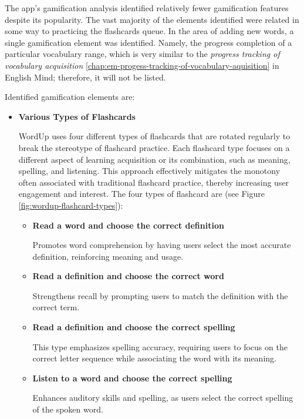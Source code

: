 The app's gamification analysis identified relatively fewer gamification features despite its popularity. The vast majority of the elements identified were related in some way to practicing the flashcards queue. In the area of adding new words, a single gamification element was identified. Namely, the progress completion of a particular vocabulary range, which is very similar to the \textit{progress tracking of vocabulary acquisition} \ref{chap:em-progess-tracking-of-vocabulary-aquisition} in English Mind; therefore, it will not be listed.

Identified gamification elements are:

\begin{itemize}
    \item \textbf{Various Types of Flashcards}

     WordUp uses four different types of flashcards that are rotated regularly to break the stereotype of flashcard practice. Each flashcard type focuses on a different aspect of learning acquisition or its combination, such as meaning, spelling, and listening. This approach effectively mitigates the monotony often associated with traditional flashcard practice, thereby increasing user engagement and interest. The four types of flashcard are (see Figure \ref{fig:wordup-flashcard-types}):
    
    \begin{itemize}
        \item \textbf{Read a word and choose the correct definition}
        
        Promotes word comprehension by having users select the most accurate definition, reinforcing meaning and usage.
        
        \item \textbf{Read a definition and choose the correct word}

        Strengthens recall by prompting users to match the definition with the correct term.
        
        \item \textbf{Read a definition and choose the correct spelling}

        This type emphasizes spelling accuracy, requiring users to focus on the correct letter sequence while associating the word with its meaning.
        
        \item \textbf{Listen to a word and choose the correct spelling}

        Enhances auditory skills and spelling, as users select the correct spelling of the spoken word.
        

\end{itemize}
\end{itemize}
